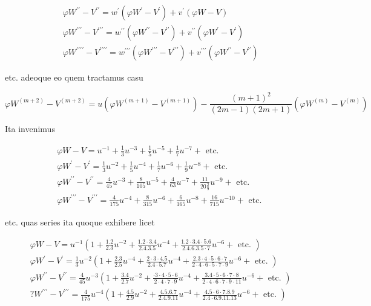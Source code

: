 \documentclass[10pt]{article}
\begin{document}
\[
\begin{aligned}
& \varphi W^{\prime \prime}-V^{\prime \prime}=w^{\prime}\left(\varphi W^{\prime}-V^{\prime}\right)+v^{\prime}(\varphi W-V) \\
& \varphi W^{\prime \prime \prime}-V^{\prime \prime \prime}=w^{\prime \prime}\left(\varphi W^{\prime \prime}-V^{\prime \prime}\right)+v^{\prime \prime}\left(\varphi W^{\prime}-V^{\prime}\right) \\
& \varphi W^{\prime \prime \prime \prime}-V^{\prime \prime \prime \prime}=w^{\prime \prime \prime}\left(\varphi W^{\prime \prime \prime}-V^{\prime \prime \prime}\right)+v^{\prime \prime \prime}\left(\varphi W^{\prime \prime}-V^{\prime \prime}\right)
\end{aligned}
\]

etc. adeoque eo quem tractamus casu

\[
\varphi W^{(m+2)}-V^{(m+2)}=u\left(\varphi W^{(m+1)}-V^{(m+1)}\right)-\frac{(m+1)^{2}}{(2 m-1)(2 m+1)}\left(\varphi W^{(m)}-V^{(m)}\right)
\]

Ita invenimus

\[
\begin{aligned}
& \varphi W-V=u^{-1}+\frac{1}{3} u^{-3}+\frac{1}{5} u^{-5}+\frac{1}{7} u^{-7}+\text { etc. } \\
& \varphi W^{\prime}-V^{\prime}=\frac{1}{3} u^{-2}+\frac{1}{5} u^{-4}+\frac{1}{7} u^{-6}+\frac{1}{9} u^{-8}+\text { etc. } \\
& \varphi W^{\prime \prime}-V^{\prime \prime}=\frac{4}{45} u^{-3}+\frac{8}{105} u^{-5}+\frac{4}{63} u^{-7}+\frac{11}{20 \frac{2}{9}} u^{-9}+\text { etc. } \\
& \varphi W^{\prime \prime \prime}-V^{\prime \prime \prime}=\frac{4}{175} u^{-4}+\frac{8}{315} u^{-6}+\frac{6}{165} u^{-8}+\frac{16}{715} u^{-10}+\text { etc. }
\end{aligned}
\]

etc. quas series ita quoque exhibere licet

\[
\begin{aligned}
& \varphi W-V=u^{-1}\left(1+\frac{1.2}{2.3} u^{-2}+\frac{1.2 \cdot 3.4}{2.4 .3 .5} u^{-4}+\frac{1.2 \cdot 3.4 \cdot 5.6}{2.4 .6 .3 .5 \cdot 7} u^{-6}+\text { etc. }\right) \\
& \varphi W^{\prime}-V^{\prime}=\frac{1}{3} u^{-2}\left(1+\frac{2.3}{2.5} u^{-4}+\frac{2 \cdot 3 \cdot 4.5}{2.4 \cdot 5.7} u^{-4}+\frac{2.3 \cdot 4 \cdot 5 \cdot 6 \cdot 7}{2 \cdot 4 \cdot 6 \cdot 5 \cdot 7 \cdot 9} u^{-6}+\text { etc. }\right) \\
& \varphi W^{\prime \prime}-V^{\prime \prime}=\frac{4}{45} u^{-3}\left(1+\frac{3.4}{2.7} u^{-2}+\frac{\cdot 3 \cdot 4 \cdot 5 \cdot 6}{2 \cdot 4 \cdot 7 \cdot 9} u^{-4}+\frac{3.4 \cdot 5 \cdot 6 \cdot 7 \cdot 8}{2 \cdot 4 \cdot 6 \cdot 7 \cdot 9 \cdot 11} u^{-6}+\text { etc. }\right) \\
& ? W^{\prime \prime \prime}-V^{\prime \prime \prime}=\frac{4}{175} u^{-4}\left(1+\frac{4.5}{2.9} u^{-2}+\frac{4.5 .6 .7}{2.4 .9 .11} u^{-4}+\frac{4.5 \cdot 6 \cdot 7.8 .9}{2.4 \cdot 6.9 .11 .13} u^{-6}+\text { etc. }\right)
\end{aligned}
\]
\end{document}
